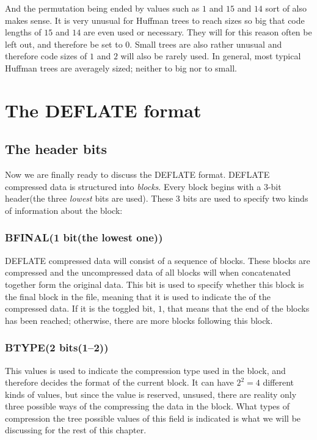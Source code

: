And the permutation being ended by values such as $1$ and $15$ and
$14$ sort of also makes sense. It is very unusual for Huffman trees to
reach sizes so big that code lengths of $15$ and $14$ are even used or
necessary. They will for this reason often be left out, and therefore
be set to $0$. Small trees are also rather unusual and therefore code
sizes of $1$ and $2$ will also be rarely used. In general, most
typical Huffman trees are averagely sized; neither to big nor to
small.

\section{The DEFLATE format}

\subsection{The header bits}

Now we are finally ready to discuss the DEFLATE format. DEFLATE
compressed data is structured into \textit{blocks}. Every block
begins with a 3-bit header(the three \textit{lowest} bits are
used). These 3 bits are used to specify two kinds of information about
the block:

\subsubsection{BFINAL(1 bit(the lowest one))}

DEFLATE compressed data will consist of a sequence of blocks. These
blocks are compressed and the uncompressed data of all blocks will
when concatenated together form the original data. This bit is used to
specify whether this block is the final block in the file, meaning
that it is used to indicate the of the compressed data. If it is the
toggled bit, $1$, that means that the end of the blocks has been
reached; otherwise, there are more blocks following this block.

\subsubsection{BTYPE(2 bits(1--2))}

This values is used to indicate the compression type used in the
block, and therefore decides the format of the current block. It can
have $2^2 = 4$ different kinds of values, but since the value 
is reserved, unsused, there are reality only three possible
ways of the compressing the data in the block. What types of
compression the tree possible values of this field is indicated is
what we will be discussing for the rest of this chapter.


